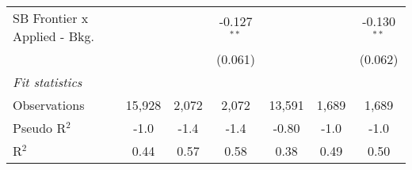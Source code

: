 \begin{tabular}{lcccccc}
   SB Frontier x Applied - Bkg.   &             &               & -0.127$^{**}$  &               &               & -0.130$^{**}$\\   
                                  &             &               & (0.061)        &               &               & (0.062)\\   
   \midrule
   \emph{Fit statistics}\\
   Observations                   & 15,928      & 2,072         & 2,072          & 13,591        & 1,689         & 1,689\\  
   Pseudo R$^2$                   & -1.0        & -1.4          & -1.4           & -0.80         & -1.0          & -1.0\\  
   R$^2$                          & 0.44        & 0.57          & 0.58           & 0.38          & 0.49          & 0.50\\  
   

\end{tabular}
